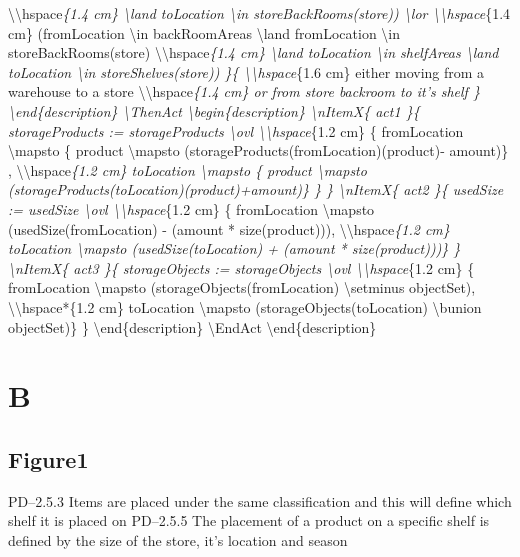 \textbackslash{}\textbackslash{}hspace\emph{\{1.4 cm\} \textbackslash{}land toLocation \textbackslash{}in storeBackRooms(store)) \textbackslash{}lor
\textbackslash{}\textbackslash{}hspace}\{1.4 cm\} (fromLocation \textbackslash{}in backRoomAreas \textbackslash{}land fromLocation \textbackslash{}in storeBackRooms(store)
\textbackslash{}\textbackslash{}hspace\emph{\{1.4 cm\} \textbackslash{}land toLocation \textbackslash{}in shelfAreas \textbackslash{}land toLocation \textbackslash{}in storeShelves(store)) \}\{ \textbackslash{}\textbackslash{}hspace}\{1.6 cm\} either moving from a warehouse to a store
\textbackslash{}\textbackslash{}hspace\emph{\{1.4 cm\} or from store backroom to it's shelf \}
\textbackslash{}end\{description\}
\textbackslash{}ThenAct
\textbackslash{}begin\{description\}
\textbackslash{}nItemX\{ act1 \}\{ storageProducts := storageProducts \textbackslash{}ovl
\textbackslash{}\textbackslash{}hspace}\{1.2 cm\} \{ fromLocation \textbackslash{}mapsto \{ product \textbackslash{}mapsto (storageProducts(fromLocation)(product)- amount)\} ,
\textbackslash{}\textbackslash{}hspace\emph{\{1.2 cm\} toLocation \textbackslash{}mapsto \{ product \textbackslash{}mapsto (storageProducts(toLocation)(product)+amount)\} \} \}
\textbackslash{}nItemX\{ act2 \}\{ usedSize := usedSize \textbackslash{}ovl
\textbackslash{}\textbackslash{}hspace}\{1.2 cm\} \{ fromLocation \textbackslash{}mapsto (usedSize(fromLocation) - (amount * size(product))),
\textbackslash{}\textbackslash{}hspace\emph{\{1.2 cm\} toLocation \textbackslash{}mapsto (usedSize(toLocation) + (amount * size(product)))\} \}
\textbackslash{}nItemX\{ act3 \}\{ storageObjects := storageObjects \textbackslash{}ovl
\textbackslash{}\textbackslash{}hspace}\{1.2 cm\} \{ fromLocation \textbackslash{}mapsto (storageObjects(fromLocation) \textbackslash{}setminus objectSet),
\textbackslash{}\textbackslash{}hspace*\{1.2 cm\} toLocation \textbackslash{}mapsto (storageObjects(toLocation) \textbackslash{}bunion objectSet)\} \}
\textbackslash{}end\{description\}
\textbackslash{}EndAct
\textbackslash{}end\{description\}

\section{B}
\label{b}

\subsection{Figure1}
\label{figure1}

PD--2.5.3 Items are placed under the same classification and this will define which shelf it is
placed on
PD--2.5.5 The placement of a product on a specific shelf is defined by the size of the store,
it’s location and season

